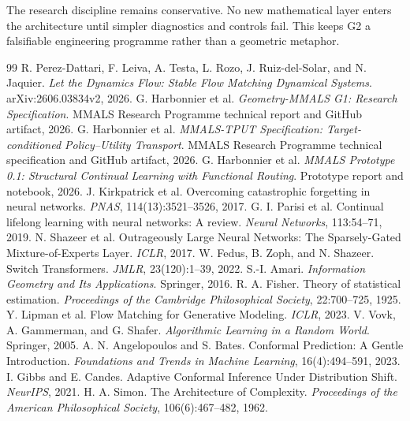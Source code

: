 \documentclass[11pt,a4paper]{article}
\begin{document}
The research discipline remains conservative. No new mathematical layer enters the architecture until simpler diagnostics and controls fail. This keeps G2 a falsifiable engineering programme rather than a geometric metaphor.

\begin{thebibliography}{99}
 R. Perez-Dattari, F. Leiva, A. Testa, L. Rozo, J. Ruiz-del-Solar, and N. Jaquier. \emph{Let the Dynamics Flow: Stable Flow Matching Dynamical Systems}. arXiv:2606.03834v2, 2026.
 G. Harbonnier et al. \emph{Geometry-MMALS G1: Research Specification}. MMALS Research Programme technical report and GitHub artifact, 2026.
 G. Harbonnier et al. \emph{MMALS-TPUT Specification: Target-conditioned Policy--Utility Transport}. MMALS Research Programme technical specification and GitHub artifact, 2026.
 G. Harbonnier et al. \emph{MMALS Prototype 0.1: Structural Continual Learning with Functional Routing}. Prototype report and notebook, 2026.
 J. Kirkpatrick et al. Overcoming catastrophic forgetting in neural networks. \emph{PNAS}, 114(13):3521--3526, 2017.
 G. I. Parisi et al. Continual lifelong learning with neural networks: A review. \emph{Neural Networks}, 113:54--71, 2019.
 N. Shazeer et al. Outrageously Large Neural Networks: The Sparsely-Gated Mixture-of-Experts Layer. \emph{ICLR}, 2017.
 W. Fedus, B. Zoph, and N. Shazeer. Switch Transformers. \emph{JMLR}, 23(120):1--39, 2022.
 S.-I. Amari. \emph{Information Geometry and Its Applications}. Springer, 2016.
 R. A. Fisher. Theory of statistical estimation. \emph{Proceedings of the Cambridge Philosophical Society}, 22:700--725, 1925.
 Y. Lipman et al. Flow Matching for Generative Modeling. \emph{ICLR}, 2023.
 V. Vovk, A. Gammerman, and G. Shafer. \emph{Algorithmic Learning in a Random World}. Springer, 2005.
 A. N. Angelopoulos and S. Bates. Conformal Prediction: A Gentle Introduction. \emph{Foundations and Trends in Machine Learning}, 16(4):494--591, 2023.
 I. Gibbs and E. Candes. Adaptive Conformal Inference Under Distribution Shift. \emph{NeurIPS}, 2021.
 H. A. Simon. The Architecture of Complexity. \emph{Proceedings of the American Philosophical Society}, 106(6):467--482, 1962.
\end{thebibliography}
\end{document}
